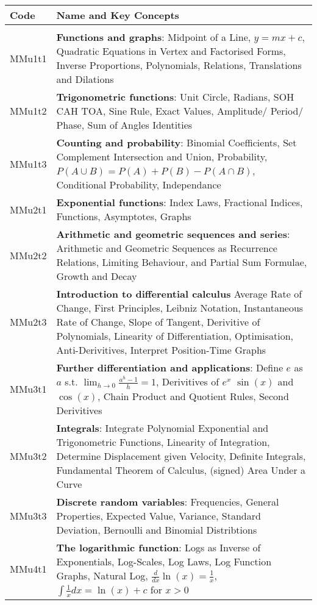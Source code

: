 \documentclass[varwidth=144mm, 12pt]{standalone}
\begin{document}
\begin{longtable}{lp{}}
Code & \textbf{Name} and Key Concepts \\ \hline
& \\ \endhead
MMu1t1 & \textbf{Functions and graphs}: Midpoint of a Line, $y = mx + c$, Quadratic Equations in Vertex and Factorised Forms, Inverse Proportions, Polynomials, Relations, Translations and Dilations \\
MMu1t2 & \textbf{Trigonometric functions}: Unit Circle, Radians, SOH CAH TOA, Sine Rule, Exact Values, Amplitude/ Period/ Phase, Sum of Angles Identities \\
MMu1t3 & \textbf{Counting and probability}: Binomial Coefficients, Set Complement Intersection and Union, Probability, $P(A\cup{}B) = P(A) + P(B) - P(A\cap{}B)$, Conditional Probability, Independance \\
MMu2t1 & \textbf{Exponential functions}: Index Laws, Fractional Indices, Functions, Asymptotes, Graphs \\
MMu2t2 & \textbf{Arithmetic and geometric sequences and series}: Arithmetic and Geometric Sequences as Recurrence Relations, Limiting Behaviour, and Partial Sum Formulae, Growth and Decay \\
MMu2t3 & \textbf{Introduction to differential calculus} Average Rate of Change, First Principles, Leibniz Notation, Instantaneous Rate of Change, Slope of Tangent, Derivitive of Polynomials, Linearity of Differentiation, Optimisation, Anti-Derivitives, Interpret Position-Time Graphs \\
MMu3t1 & \textbf{Further differentiation and applications}: Define $e$ as $a$ s.t. $\lim_{h \to 0} \frac{a^h - 1}{h} = 1$, Derivitives of $e^x$ $\sin(x)$ and $\cos(x)$, Chain Product and Quotient Rules, Second Derivitives \\
MMu3t2 & \textbf{Integrals}: Integrate Polynomial Exponential and Trigonometric Functions, Linearity of Integration,  Determine Displacement given Velocity, Definite Integrals, Fundamental Theorem of Calculus, (signed) Area Under a Curve \\
MMu3t3 & \textbf{Discrete random variables}: Frequencies, General Properties, Expected Value, Variance, Standard Deviation, Bernoulli and Binomial Distribtions \\
MMu4t1 & \textbf{The logarithmic function}: Logs as Inverse of Exponentials, Log-Scales, Log Laws, Log Function Graphs, Natural Log, $\frac{d}{dx}\ln(x) = \frac{1}{x}$, $\int{\frac{1}{x}dx} = \ln(x) + c$ for $x > 0$ \\

\end{longtable}
\end{document}
